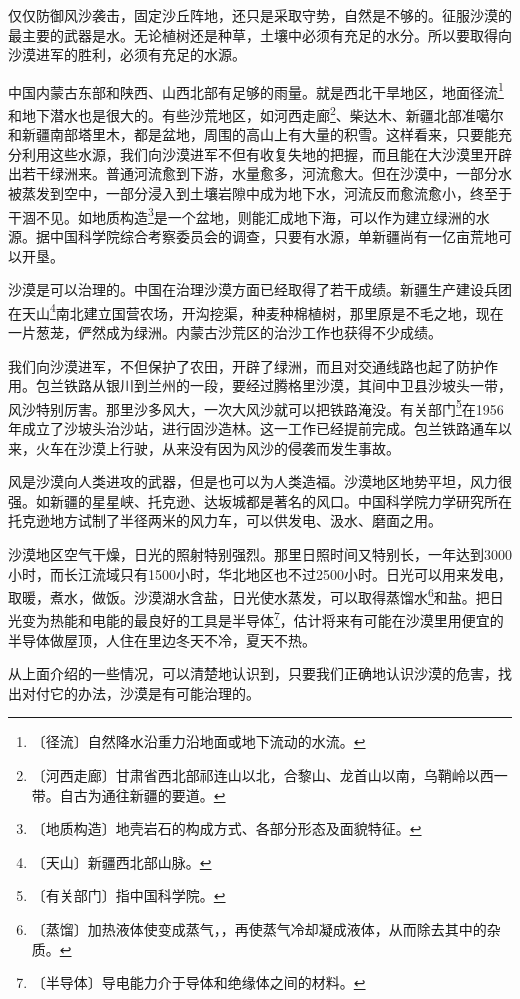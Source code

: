 \documentclass[12pt,UTF-8,openany]{ctexbook}
\begin{document}
\begin{normalsize}
    仅仅防御风沙袭击，固定沙丘阵地，还只是采取守势，自然是不够的。征服沙漠的最主要的武器是水。无论植树还是种草，土壤中必须有充足的水分。所以要取得向沙漠进军的胜利，必须有充足的水源。
    
    中国内蒙古东部和陕西、山西北部有足够的雨量。就是西北干旱地区，地面径流\footnote{〔径流〕自然降水沿重力沿地面或地下流动的水流。}和地下潜水也是很大的。有些沙荒地区，如河西走廊\footnote{〔河西走廊〕甘肃省西北部祁连山以北，合黎山、龙首山以南，乌鞘岭以西一带。自古为通往新疆的要道。}、柴达木、新疆北部准噶尔和新疆南部塔里木，都是盆地，周围的高山上有大量的积雪。这样看来，只要能充分利用这些水源，我们向沙漠进军不但有收复失地的把握，而且能在大沙漠里开辟出若干绿洲来。普通河流愈到下游，水量愈多，河流愈大。但在沙漠中，一部分水被蒸发到空中，一部分浸入到土壤岩隙中成为地下水，河流反而愈流愈小，终至于干涸不见。如地质构造\footnote{〔地质构造〕地壳岩石的构成方式、各部分形态及面貌特征。}是一个盆地，则能汇成地下海，可以作为建立绿洲的水源。据中国科学院综合考察委员会的调查，只要有水源，单新疆尚有一亿亩荒地可以开垦。
    
    沙漠是可以治理的。中国在治理沙漠方面已经取得了若干成绩。新疆生产建设兵团在天山\footnote{〔天山〕新疆西北部山脉。}南北建立国营农场，开沟挖渠，种麦种棉植树，那里原是不毛之地，现在一片葱茏，俨然成为绿洲。内蒙古沙荒区的治沙工作也获得不少成绩。
    
    我们向沙漠进军，不但保护了农田，开辟了绿洲，而且对交通线路也起了防护作用。包兰铁路从银川到兰州的一段，要经过腾格里沙漠，其间中卫县沙坡头一带，风沙特别厉害。那里沙多风大，一次大风沙就可以把铁路淹没。有关部门\footnote{〔有关部门〕指中国科学院。}在1956年成立了沙坡头治沙站，进行固沙造林。这一工作已经提前完成。包兰铁路通车以来，火车在沙漠上行驶，从来没有因为风沙的侵袭而发生事故。
    
    风是沙漠向人类进攻的武器，但是也可以为人类造福。沙漠地区地势平坦，风力很强。如新疆的星星峡、托克逊、达坂城都是著名的风口。中国科学院力学研究所在托克逊地方试制了半径两米的风力车，可以供发电、汲水、磨面之用。
    
    沙漠地区空气干燥，日光的照射特别强烈。那里日照时间又特别长，一年达到3000小时，而长江流域只有1500小时，华北地区也不过2500小时。日光可以用来发电，取暖，煮水，做饭。沙漠湖水含盐，日光使水蒸发，可以取得蒸馏水\footnote{〔蒸馏〕加热液体使变成蒸气，，再使蒸气冷却凝成液体，从而除去其中的杂质。}和盐。把日光变为热能和电能的最良好的工具是半导体\footnote{〔半导体〕导电能力介于导体和绝缘体之间的材料。}，估计将来有可能在沙漠里用便宜的半导体做屋顶，人住在里边冬天不冷，夏天不热。
    
    从上面介绍的一些情况，可以清楚地认识到，只要我们正确地认识沙漠的危害，找出对付它的办法，沙漠是有可能治理的。
    
\end{normalsize}
\end{document}
